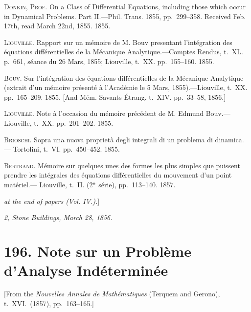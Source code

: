 \documentclass[12pt,a4paper]{article}
\theoremstyle{definition}
\begin{document}
\smallskip

\noindent\textsc{Donkin, Prof.} On a Class of Differential Equations, including those which occur in
Dynamical Problems. Part II.---Phil. Trans. 1855, pp.~299--358. Received Feb. 17th,
read March 22nd, 1855. 1855.

\smallskip

\noindent\textsc{Liouville}. Rapport sur un m\'emoire de M. Bouv presentant l'int\'egration des \'equations
diff\'erentielles de la M\'ecanique Analytique.---Comptes Rendus, t.~XL. p.~661, s\'eance
du 26 Mars, 1855; Liouville, t.~XX. pp.~155--160. 1855.

\smallskip

\noindent\textsc{Bouv}. Sur l'int\'egration des \'equations diff\'erentielles de la M\'ecanique Analytique
(extrait d'un m\'emoire pr\'esent\'e \`a l'Acad\'emie le 5 Mars, 1855).---Liouville, t.~XX.
pp.~165--209. 1855. [And M\'em. Savants \'Etrang. t.~XIV. pp.~33--58, 1856.]

\smallskip

\noindent\textsc{Liouville}. Note \`a l'occasion du m\'emoire pr\'ec\'edent de M. Edmund Bouv.---Liouville,
t.~XX. pp.~201--202. 1855.

\smallskip

\noindent\textsc{Brioschi}. Sopra una nuova propriet\`a degli integrali di un problema di dinamica.---
Tortolini, t.~VI. pp.~450--452. 1855.

\smallskip

\noindent\textsc{Bertrand}. M\'emoire sur quelques unes des formes les plus simples que puissent prendre
les int\'egrales des \'equations diff\'erentielles du mouvement d'un point mat\'eriel.---
Liouville, t.~II. (2$^{\rm e}$ s\'erie), pp.~113--140. 1857.

\medskip

\noindent[\textit{See} [298] \textit{at the end of papers (Vol. IV.).}]

\bigskip

\noindent\textit{2, Stone Buildings, March 28, 1856.}

\newpage


\section*{196. Note sur un Probl\`eme d'Analyse Ind\'etermin\'ee}

\begin{center}
[From the \textit{Nouvelles Annales de Math\'ematiques} (Terquem and Gerono), t.~XVI.~(1857),
pp.~163--165.]
\end{center}
\end{document}

